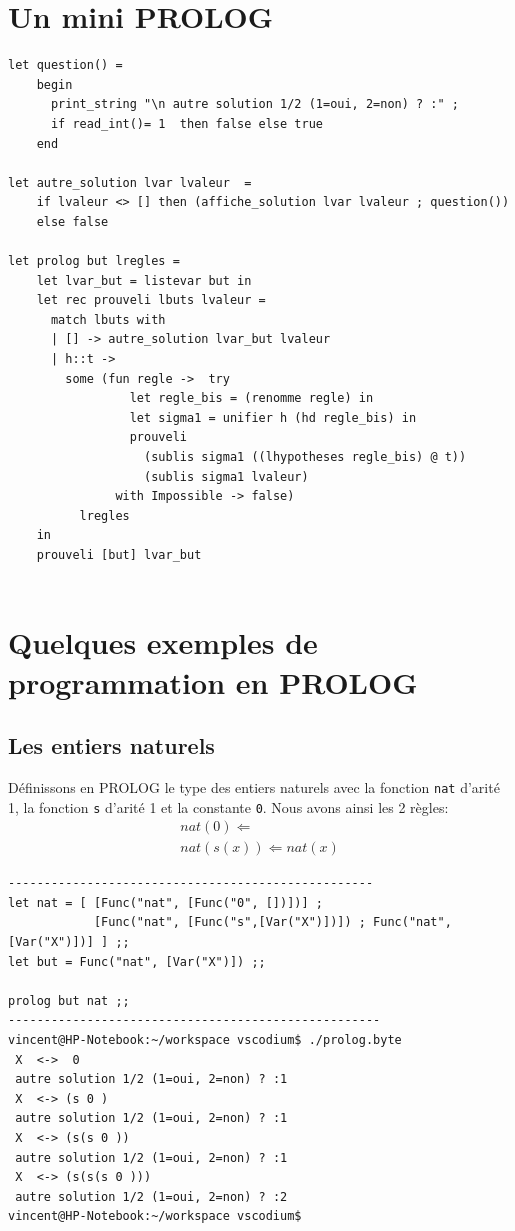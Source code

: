 \documentclass[11pt]{book}
\begin{document}
\section{Un mini PROLOG}
\begin{Verbatim}
let question() =
	begin
	  print_string "\n autre solution 1/2 (1=oui, 2=non) ? :" ;
	  if read_int()= 1  then false else true 
	end
  
let autre_solution lvar lvaleur  =
	if lvaleur <> [] then (affiche_solution lvar lvaleur ; question())
	else false 
  
let prolog but lregles =
	let lvar_but = listevar but in
	let rec prouveli lbuts lvaleur =
	  match lbuts with
	  | [] -> autre_solution lvar_but lvaleur
	  | h::t -> 
		some (fun regle ->  try
				 let regle_bis = (renomme regle) in
				 let sigma1 = unifier h (hd regle_bis) in			
				 prouveli 
				   (sublis sigma1 ((lhypotheses regle_bis) @ t))
				   (sublis sigma1 lvaleur)  
			   with Impossible -> false)
		  lregles 
	in
	prouveli [but] lvar_but
  
\end{Verbatim}

\section{Quelques exemples de programmation en PROLOG}
\subsection{Les entiers naturels}
Définissons en PROLOG le type des entiers naturels avec la fonction \verb+nat+ d'arité 1, la fonction \verb+s+
d'arité 1 et la constante \verb+0+.
Nous avons ainsi les 2 règles:
$$
\begin{array}{l}
nat(0) \Leftarrow \\
nat(s(x)) \Leftarrow nat(x)
\end{array}
$$
\begin{Verbatim}
---------------------------------------------------
let nat = [ [Func("nat", [Func("0", [])])] ;
            [Func("nat", [Func("s",[Var("X")])]) ; Func("nat", [Var("X")])] ] ;;
let but = Func("nat", [Var("X")]) ;; 

prolog but nat ;;
----------------------------------------------------
vincent@HP-Notebook:~/workspace vscodium$ ./prolog.byte 
 X  <->  0 
 autre solution 1/2 (1=oui, 2=non) ? :1
 X  <-> (s 0 )
 autre solution 1/2 (1=oui, 2=non) ? :1
 X  <-> (s(s 0 ))
 autre solution 1/2 (1=oui, 2=non) ? :1
 X  <-> (s(s(s 0 )))
 autre solution 1/2 (1=oui, 2=non) ? :2
vincent@HP-Notebook:~/workspace vscodium$ 
\end{Verbatim}
\end{document}
